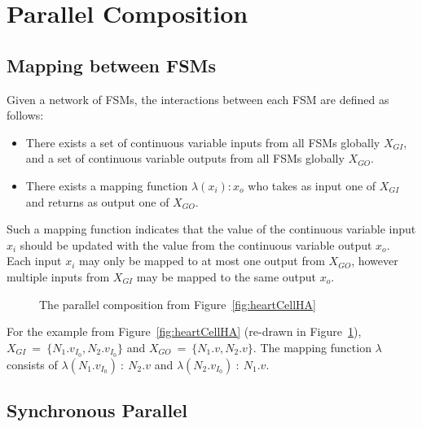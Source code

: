 \section{Parallel Composition}
\label{sec:composition}


\subsection{Mapping between \acp{FSM}}
\label{sec:mapping}

Given a network of \acp{FSM}, the interactions between each \ac{FSM} are 
defined as follows:
\begin{itemize}
	\item There exists a set of continuous variable inputs from all \acp{FSM} 
	globally $X_{GI}$, and a set of continuous variable outputs from all 
	\acp{FSM} globally $X_{GO}$.
	\item There exists a mapping function $\lambda(x_i) : x_o$ who takes as 
	input one of $X_{GI}$ and returns as output one of $X_{GO}$.
\end{itemize}

Such a mapping function indicates that the value of the continuous variable 
input $x_i$ should be updated with the value from the continuous variable 
output $x_o$.  Each input $x_i$ may only be mapped to at most one 
output from $X_{GO}$, however multiple inputs from $X_{GI}$ may be mapped to 
the same output $x_o$.

\begin{figure}
	\centering
	
	\caption{The parallel composition from Figure~\ref{fig:heartCellHA} 
		\label{fig:networkComposition}}
\end{figure}

For the example from Figure~\ref{fig:heartCellHA} (re-drawn in 
Figure~\ref{fig:networkComposition}), 
$X_{GI}~=~\{N_{1}.v_{I_{0}},N_{2}.v_{I_{0}}\}$ and 
$X_{GO}~=~\{N_{1}.v,N_{2}.v\}$. 
The mapping function $\lambda$ consists of 
$\lambda(N_{1}.v_{I_{0}})~:~N_{2}.v$ and $\lambda(N_{2}.v_{I_{0}})~:~N_{1}.v$.

\subsection{Synchronous Parallel}
\label{sec:synchronousParallel}

%  

